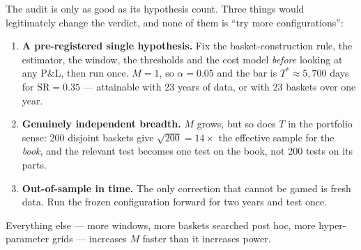 The audit is only as good as its hypothesis count. Three things would legitimately change
the verdict, and none of them is ``try more configurations'':
\begin{enumerate}
  \item \textbf{A pre-registered single hypothesis.} Fix the basket-construction rule,
    the estimator, the window, the thresholds and the cost model \emph{before} looking at
    any P\&L, then run once. $M=1$, so $\alpha=0.05$ and the bar is
    $T^\ast\approx5{,}700$ days for $\mathrm{SR}=0.35$ --- attainable with 23 years of
    data, or with 23 baskets over one year.
  \item \textbf{Genuinely independent breadth.} $M$ grows, but so does $T$ in the
    portfolio sense: 200 disjoint baskets give $\sqrt{200}=14\times$ the effective sample
    for the \emph{book}, and the relevant test becomes one test on the book, not 200 tests
    on its parts.
  \item \textbf{Out-of-sample in time.} The only correction that cannot be gamed is fresh
    data. Run the frozen configuration forward for two years and test once.
\end{enumerate}
Everything else --- more windows, more baskets searched post hoc, more hyper-parameter
grids --- increases $M$ faster than it increases power.
